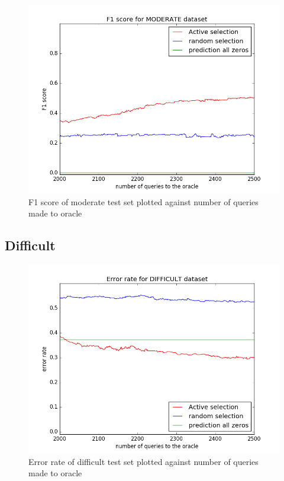 \documentclass[paper=a4, fontsize=11pt]{scrartcl}
\numberwithin{equation}{section}    %
\numberwithin{figure}{section}      %
\numberwithin{table}{section}       %
\numberwithin{equation}{section}    %
\numberwithin{figure}{section}      %
\numberwithin{table}{section}       %
\begin{document}
\begin{figure}[!htb]
  \centering
  \includegraphics[scale = 0.5]{figures/f1_moderate.png}
      \caption{F1 score of moderate test set plotted against number of queries made to oracle}
      \label{modf}
\end{figure}
\FloatBarrier
\subsection{Difficult}


\begin{figure}[!htb]
  \centering
  \includegraphics[scale = 0.5]{figures/error_difficult.png}
      \caption{Error rate of difficult test set plotted against number of queries made to oracle}
      \label{harderror}
\end{figure}
\end{document}
